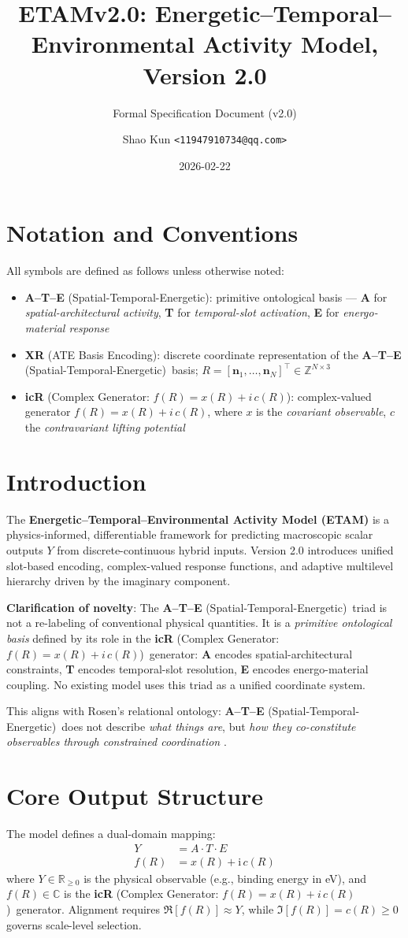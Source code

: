 \documentclass[11pt]{article}
\title{ETAMv2.0: Energetic--Temporal--Environmental Activity Model, Version 2.0}
\subtitle{Formal Specification Document (v2.0)}
\author{Shao Kun \texttt{<11947910734@qq.com>}}
\date{2026-02-22}
\newcommand{\R}{\mathbb{R}}
\newcommand{\Z}{\mathbb{Z}}
\newcommand{\C}{\mathbb{C}}
\newcommand{\RePart}{\Re}
\newcommand{\ImPart}{\Im}
\newcommand{\ATE}{\textbf{A--T--E} (Spatial-Temporal-Energetic)}
\newcommand{\XR}{\textbf{XR} (ATE Basis Encoding)}
\newcommand{\icR}{\textbf{icR} (Complex Generator: $f(R)=x(R)+i\,c(R)$)}
\begin{document}
\maketitle

\section{Notation and Conventions}
\label{sec:notation}
All symbols are defined as follows unless otherwise noted:
\begin{itemize}[leftmargin=*, nosep]
    \item \ATE: primitive ontological basis — \textbf{A} for \emph{spatial-architectural activity}, \textbf{T} for \emph{temporal-slot activation}, \textbf{E} for \emph{energo-material response}
    \item \XR: discrete coordinate representation of the \ATE\ basis; $R = [\mathbf{n}_1,\dots,\mathbf{n}_N]^\top \in \Z^{N \times 3}$
    \item \icR: complex-valued generator $f(R) = x(R) + i\,c(R)$, where $x$ is the \emph{covariant observable}, $c$ the \emph{contravariant lifting potential}
\end{itemize}

\section{Introduction}
\label{sec:introduction}
The \textbf{Energetic--Temporal--Environmental Activity Model (ETAM)} is a physics-informed, differentiable framework for predicting macroscopic scalar outputs $Y$ from discrete-continuous hybrid inputs. Version 2.0 introduces unified slot-based encoding, complex-valued response functions, and adaptive multilevel hierarchy driven by the imaginary component.

\textbf{Clarification of novelty}: The \ATE\ triad is not a re-labeling of conventional physical quantities. It is a \emph{primitive ontological basis} defined by its role in the \icR\ generator: \textbf{A} encodes spatial-architectural constraints, \textbf{T} encodes temporal-slot resolution, \textbf{E} encodes energo-material coupling. No existing model uses this triad as a unified coordinate system.

This aligns with Rosen's relational ontology: \ATE\ does not describe \emph{what things are}, but \emph{how they co-constitute observables through constrained coordination} \cite{rosen1978}.

\section{Core Output Structure}
\label{sec:core-output}
The model defines a dual-domain mapping:
\begin{align}
    Y &= A \cdot T \cdot E \label{eq:output-physical-observable} \\
    f(R) &= x(R) + \mathrm{i}\, c(R) \label{eq:response-complex-generator}
\end{align}
where $Y \in \R_{\geq 0}$ is the physical observable (e.g., binding energy in \si{\electronvolt}), and $f(R) \in \C$ is the \icR\ generator. Alignment requires $\RePart[f(R)] \approx Y$, while $\ImPart[f(R)] = c(R) \geq 0$ governs scale-level selection.
\end{document}
